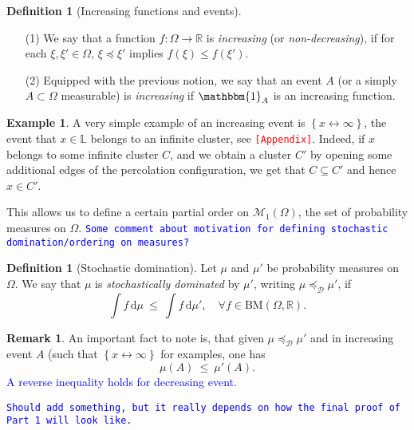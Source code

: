 \documentclass[12pt]{article}
\newcommand{\D}{\mathcal{D}}
\renewcommand{\d}{\mathrm{d}}
\renewcommand{\L}{\mathbb{L}}
\newcommand{\M}{\mathcal{M}}
\newcommand{\R}{\mathbb{R}}
\newcommand{\BM}{\mathrm{BM}}
\newcommand{\set}[1]{\left\{#1\right\}}
\newcommand{\ra}{\rightarrow}
\newcommand{\1}{\mathbbm{1}}
\newcommand{\5}{\vspace{0.5cm}}
\theoremstyle{definition}
\newtheorem{ex}[thm]{Example}
\newtheorem{df}[thm]{Definition}
\newtheorem{rem}[thm]{Remark}
\begin{document}
\begin{df}[Increasing functions and events]
~
\begin{itemize}
	\item[(1)] We say that a function $f:\Omega\ra\R$ is \textit{increasing} (or \textit{non-decreasing}), if for each $\xi,\xi'\in\Omega$, $\xi\preceq\xi'$ implies $f(\xi)\leq f(\xi')$. 
	\item[(2)] Equipped with the previous notion, we say that an event $A$ (or a simply $A\subset\Omega$ measurable) is \textit{increasing} if $\1_A$ is an increasing function.
\end{itemize}
\end{df}

\begin{ex}
A very simple example of an increasing event is $\set{x\leftrightarrow\infty}$, the event that $x\in\L$ belongs to an infinite cluster, see \textcolor{red}{\texttt{[Appendix]}}. Indeed, if $x$ belongs to some infinite cluster $C$, and we obtain a cluster $C'$ by opening some additional edges of the percolation configuration, we get that $C\subseteq C'$ and hence $x\in C'$.
\end{ex}

 This allows us to define a certain partial order on $\M_1(\Omega)$, the set of probability measures on $\Omega$. \textcolor{blue}{\texttt{Some comment about motivation for defining stochastic domination/ordering on measures?}}
 
\begin{df}[Stochastic domination]
Let $\mu$ and $\mu'$ be probability measures on $\Omega$. We say that $\mu$ is \textit{stochastically dominated} by $\mu'$, writing $\mu\preceq_\D\mu'$, if
$$\int f\,\d\mu ~\leq~ \int f\,\d\mu', \quad \forall f\in\BM(\Omega,\R).$$
\end{df}

\begin{rem}
An important fact to note is, that given $\mu\preceq_\D\mu'$ and in increasing event $A$ (such that $\set{x\leftrightarrow\infty}$ for examples, one has 
$$\mu(A) ~\leq~ \mu'(A).$$
\textcolor{blue}{A reverse inequality holds for decreasing event.}
\end{rem}

\textcolor{blue}{\texttt{Should add something, but it really depends on how the final proof of Part 1 will look like.}}

\end{document}
